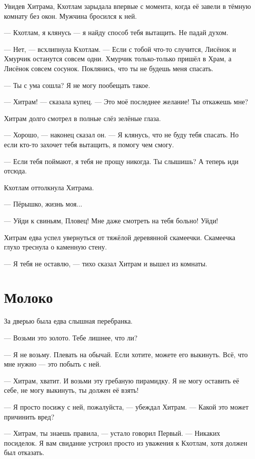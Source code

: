 \documentclass[a4paper,10pt,fleqn]{book}\usepackage{cooltooltips}\usepackage{polyglossia}\setdefaultlanguage{english}\setotherlanguage{russian}\defaultfontfeatures{Ligatures=TeX,Mapping=tex-text} \usepackage{xcolor}\definecolor{lightgray}{HTML}{bbbbbb}\color{lightgray}\newcommand{\ml}[3]{\textcolor{black}{#3}}
\begin{document}
Увидев Хитрама, Кхотлам зарыдала впервые с момента, когда её завели в тёмную комнату без окон.
Мужчина бросился к ней.

--- Кхотлам, я клянусь --- я найду способ тебя вытащить.
Не падай духом.

--- Нет, --- всхлипнула Кхотлам.
--- Если с тобой что-то случится, Лисёнок и Хмурчик останутся совсем одни.
Хмурчик только-только пришёл в Храм, а Лисёнок совсем сосунок.
Поклянись, что ты не будешь меня спасать.

--- Ты с ума сошла?
Я не могу пообещать такое.

--- Хитрам! --- сказала купец.
--- Это моё последнее желание!
Ты откажешь мне?

Хитрам долго смотрел в полные слёз зелёные глаза.

--- Хорошо, --- наконец сказал он.
--- Я клянусь, что не буду тебя спасать.
Но если кто-то захочет тебя вытащить, я помогу чем смогу.

--- Если тебя поймают, я тебя не прощу никогда.
Ты слышишь?
А теперь иди отсюда.

Кхотлам оттолкнула Хитрама.

--- Пёрышко, жизнь моя...

--- Уйди к свиньям, Пловец!
Мне даже смотреть на тебя больно!
Уйди!

Хитрам едва успел увернуться от тяжёлой деревянной скамеечки.
Скамеечка глухо треснула о каменную стену.

--- Я тебя не оставлю, --- тихо сказал Хитрам и вышел из комнаты.

\section{Молоко}

За дверью была едва слышная перебранка.

--- Возьми это золото.
Тебе лишнее, что ли?

--- Я не возьму.
Плевать на обычай.
Если хотите, можете его выкинуть.
Всё, что мне нужно --- это побыть с ней.

--- Хитрам, хватит.
И возьми эту гребаную пирамидку.
Я не могу оставить её себе, не могу выкинуть, ты должен её взять!

--- Я просто посижу с ней, пожалуйста, --- убеждал Хитрам.
--- Какой это может причинить вред?

--- Хитрам, ты знаешь правила, --- устало говорил Первый.
--- Никаких посиделок.
Я вам свидание устроил просто из уважения к Кхотлам, хотя должен был отказать.
\end{document}
